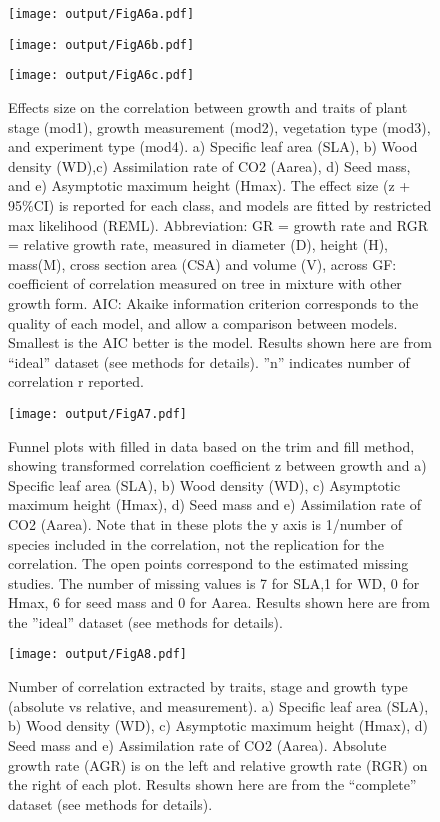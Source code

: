 \documentclass[a4paper,11pt]{article}
\begin{document}
\begin{appendices}
\begin{figure}[h!]
\centering
\texttt{[image: output/FigA6a.pdf]}
\end{figure}

\begin{figure}[h!]
\centering
\texttt{[image: output/FigA6b.pdf]}
\end{figure}

\begin{figure}[h!]
\centering
\texttt{[image: output/FigA6c.pdf]}
\caption{Effects size on the correlation between growth and traits of plant stage (mod1), growth measurement (mod2), vegetation type (mod3),  and experiment type (mod4). a) Specific leaf area (SLA), b) Wood density (WD),c) Assimilation rate of CO2 (Aarea), d) Seed mass, and e) Asymptotic maximum height (Hmax). The effect size (z + 95\%CI) is reported for each class, and models are fitted by restricted max likelihood (REML). Abbreviation: GR = growth rate and RGR = relative growth rate, measured in diameter (D), height (H), mass(M), cross section area (CSA) and volume (V), across GF: coefficient of correlation measured on tree in mixture with other growth form. AIC: Akaike information criterion corresponds to the quality of each model, and allow a comparison between models. Smallest is the AIC better is the model. Results shown here are from ``ideal'' dataset (see methods for details). ''n'' indicates number of correlation r reported.}
\label{fig:figA6}
\end{figure}

\begin{figure}[h!]
\centering
\texttt{[image: output/FigA7.pdf]}
\caption{Funnel plots with filled in data based on the trim and fill method, showing transformed correlation coefficient z between growth and a) Specific leaf area (SLA), b) Wood density (WD), c) Asymptotic maximum height (Hmax), d) Seed mass and e) Assimilation rate of CO2 (Aarea). Note that in these plots the y axis is 1/number of species included in the correlation, not the replication for the correlation. The open points correspond to the estimated missing studies. The number of missing values is 7 for SLA,1 for WD, 0 for Hmax, 6 for seed mass and 0 for Aarea. Results shown here are from the ''ideal'' dataset (see methods for details).}
\label{fig:figA7}
\end{figure}

\begin{figure}[h!]
\centering
\texttt{[image: output/FigA8.pdf]}
\caption{Number of correlation extracted by traits, stage and growth type (absolute vs relative, and measurement). a) Specific leaf area (SLA), b) Wood density (WD), c) Asymptotic maximum height (Hmax), d) Seed mass and e) Assimilation rate of CO2 (Aarea). Absolute growth rate (AGR) is on the left and relative growth rate (RGR) on the right of each plot. Results shown here are from the ``complete'' dataset (see methods for details). }
\label{fig:figA8}
\end{figure}


\end{appendices}
\end{document}
